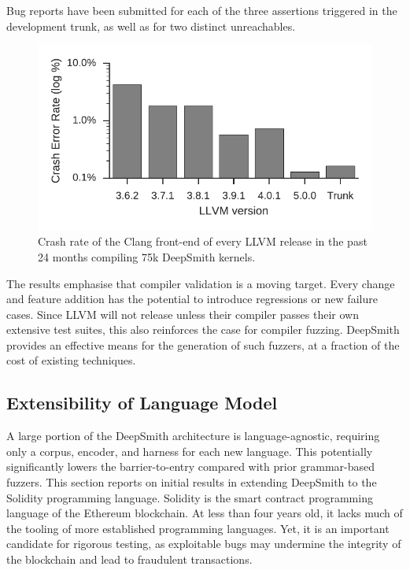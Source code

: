 \newpage
Bug reports have been submitted for each of the three assertions triggered in the development trunk, as well as for two distinct unreachables.

\begin{figure}
  \centering %
  \includegraphics[width=.85\columnwidth]{img/clang-crashes}%
  \caption[Crash rate of the Clang front-end]{%
    Crash rate of the Clang front-end of every LLVM release in the past 24 months compiling 75k DeepSmith kernels.%
  }%
  \label{fig:clang-clash-rate}
\end{figure}

\begin{table}
  \centering %
  
  \caption[Number of DeepSmith programs which trigger errors]{%
    The number of DeepSmith programs which trigger distinct Clang front-end assertions, and the number of programs which trigger unreachables.%
  }
  \label{tab:clang-crash-rate}
\end{table}

The results emphasise that compiler validation is a moving target. Every change and feature addition has the potential to introduce regressions or new failure cases. Since LLVM will not release unless their compiler passes their own extensive test suites, this also reinforces the case for compiler fuzzing. DeepSmith provides an effective means for the generation of such fuzzers, at a fraction of the cost of existing techniques.


\subsection{Extensibility of Language Model}
\label{subsec:deepsmith-solidity-extensibility}



A large portion of the DeepSmith architecture is language-agnostic, requiring only a corpus, encoder, and harness for each new language. This potentially significantly lowers the barrier-to-entry compared with prior grammar-based fuzzers. This section reports on initial results in extending DeepSmith to the Solidity programming language. Solidity is the smart contract programming language of the Ethereum blockchain. At less than four years old, it lacks much of the tooling of more established programming languages. Yet, it is an important candidate for rigorous testing, as exploitable bugs may undermine the integrity of the blockchain and lead to fraudulent transactions.


